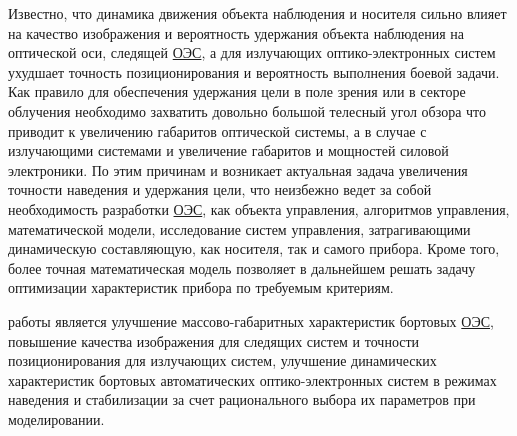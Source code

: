 Известно, что динамика движения объекта наблюдения и носителя сильно влияет на качество изображения и вероятность удержания объекта наблюдения на оптической оси, следящей  \hyperref[acroEOS]{ОЭС}, а для излучающих оптико-электронных систем ухудшает точность позиционирования и вероятность выполнения боевой задачи.  Как правило для обеспечения удержания цели в поле зрения или в секторе облучения необходимо захватить довольно большой телесный угол обзора что приводит к увеличению габаритов оптической системы, а в случае с излучающими системами и увеличение габаритов и мощностей силовой электроники. По этим причинам и возникает актуальная задача увеличения точности наведения и удержания цели, что неизбежно ведет за собой необходимость разработки \hyperref[acroEOS]{ОЭС}, как объекта управления, алгоритмов управления, математической модели, исследование систем управления, затрагивающими динамическую составляющую, как носителя, так и самого прибора. Кроме того, более точная математическая модель позволяет в дальнейшем решать задачу оптимизации характеристик прибора по требуемым критериям.

\begin{comment}
\ifsynopsis
Этот абзац появляется только в~автореферате.
\else

\fi
\end{comment}


{\aim} работы является улучшение массово-габаритных характеристик бортовых  \hyperref[acroEOS]{ОЭС}, повышение качества изображения для следящих систем и точности позиционирования для излучающих систем, улучшение динамических характеристик бортовых автоматических оптико-электронных систем в режимах наведения и стабилизации за счет рационального выбора их параметров при моделировании.

